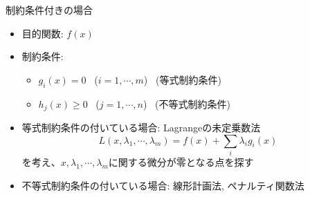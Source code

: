 \begin{frame}[t,fragile]{制約条件付きの場合}
  \begin{itemize}
  \item 目的関数: $f(x)$
  \item 制約条件:
    \begin{itemize}
    \item $g_i(x) = 0$ \ ($i=1,\cdots,m$) \ (等式制約条件)
    \item $h_j(x) \ge 0$ \ ($j=1,\cdots,n$) \ (不等式制約条件)
    \end{itemize}
  \item 等式制約条件の付いている場合: Lagrangeの未定乗数法
    \[
    L(x,\lambda_1,\cdots,\lambda_m)=f(x)+\sum_i \lambda_i g_i(x)
    \]
    を考え、$x,\lambda_1,\cdots,\lambda_m$に関する微分が零となる点を探す
  \item 不等式制約条件の付いている場合: 線形計画法, ペナルティ関数法
  \end{itemize}
\end{frame}
